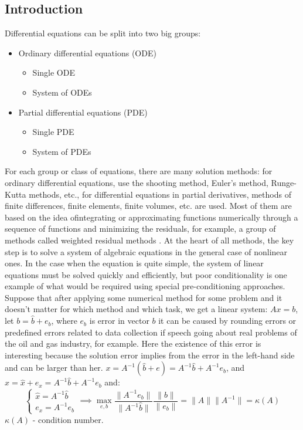\subsection{Introduction}
Differential equations can be split into two big groups:
\begin{itemize}
	\item Ordinary differential equations (ODE)
	\begin{itemize}
		\setlength\itemsep{0.5em}
		\item Single ODE
		\item System of ODEs
	\end{itemize}
	\item Partial differential equations (PDE)
	\begin{itemize}
		\setlength\itemsep{0.5em}
		\item Single PDE
		\item System of PDEs
	\end{itemize}
\end{itemize}
For each group or class of equations, there are many solution methods: for ordinary differential equations, use the shooting method, Euler's method, Runge-Kutta methods, etc., for differential equations in partial derivatives, methods of finite differences, finite elements, finite volumes, etc. are used. Most of them are based on the idea of ​​integrating or approximating functions numerically through a sequence of functions and minimizing the residuals, for example, a group of methods called weighted residual methods \cite{finlayson2013method} \cite{fletcher2012computational}. At the heart of all methods, the key step is to solve a system of algebraic equations in the general case of nonlinear ones. In the case when the equation is quite simple, the system of linear equations must be solved quickly and efficiently, but poor conditionality is one example of what would be required using special pre-conditioning approaches. Suppose that after applying some numerical method for some problem and it doesn’t matter for which method and which task, we get a linear system: $A x = b$, let $b = \hat{b} + e_b $, where $e_b$ is error in vector $b$ it can be caused by rounding errors or predefined errors related to data collection if speech going about real problems of the oil and gas industry, for example. Here the existence of this error is interesting because the solution error implies from the error in the left-hand side and can be larger than her. $x = A^{-1} (\hat{b} + e) = A^{-1} \hat{b} + A^{-1} e_b$, and $x = \hat{x} + e_x = A^{-1} \hat{b} + A^{-1} e_b$ and:
\begin{equation*}
	\begin{cases}
		\hat{x} = A^{-1} \hat{b} \\
		e_x = A^{-1} e_b
	\end{cases} \implies \max_{e, b} \dfrac{\|A^{-1} e_b\|}{\|A^{-1} \hat{b} \|} \dfrac{\|b\|}{\|e_b\|} = \| A \| \| A^{-1} \| = \kappa(A)
\end{equation*}
$\kappa(A)$ - condition number\cite{gentle2007matrix}. 

